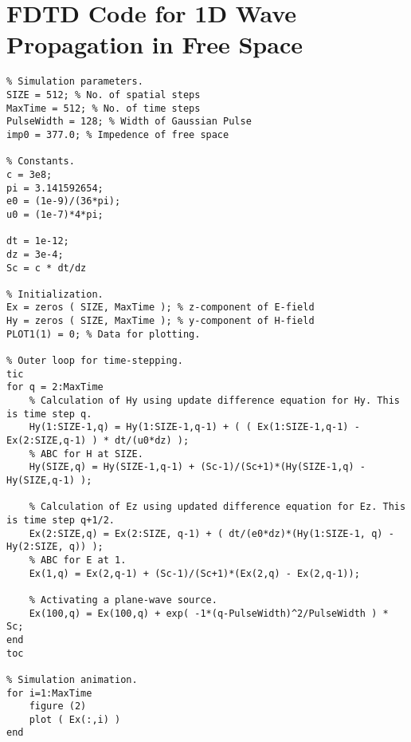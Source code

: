 \chapter{FDTD Code for 1D Wave Propagation in Free Space}
\begin{lstlisting}
% Simulation parameters.
SIZE = 512; % No. of spatial steps
MaxTime = 512; % No. of time steps
PulseWidth = 128; % Width of Gaussian Pulse
imp0 = 377.0; % Impedence of free space

% Constants.
c = 3e8;
pi = 3.141592654;
e0 = (1e-9)/(36*pi);
u0 = (1e-7)*4*pi;

dt = 1e-12;
dz = 3e-4;
Sc = c * dt/dz

% Initialization.
Ex = zeros ( SIZE, MaxTime ); % z-component of E-field
Hy = zeros ( SIZE, MaxTime ); % y-component of H-field
PLOT1(1) = 0; % Data for plotting.

% Outer loop for time-stepping.
tic
for q = 2:MaxTime
    % Calculation of Hy using update difference equation for Hy. This is time step q.
    Hy(1:SIZE-1,q) = Hy(1:SIZE-1,q-1) + ( ( Ex(1:SIZE-1,q-1) - Ex(2:SIZE,q-1) ) * dt/(u0*dz) );
    % ABC for H at SIZE.
    Hy(SIZE,q) = Hy(SIZE-1,q-1) + (Sc-1)/(Sc+1)*(Hy(SIZE-1,q) - Hy(SIZE,q-1) );
    
    % Calculation of Ez using updated difference equation for Ez. This is time step q+1/2.
    Ex(2:SIZE,q) = Ex(2:SIZE, q-1) + ( dt/(e0*dz)*(Hy(1:SIZE-1, q) - Hy(2:SIZE, q)) );
    % ABC for E at 1.
    Ex(1,q) = Ex(2,q-1) + (Sc-1)/(Sc+1)*(Ex(2,q) - Ex(2,q-1));
    
    % Activating a plane-wave source.
    Ex(100,q) = Ex(100,q) + exp( -1*(q-PulseWidth)^2/PulseWidth ) * Sc;
end
toc

% Simulation animation.
for i=1:MaxTime
    figure (2)
    plot ( Ex(:,i) )
end

\end{lstlisting}

